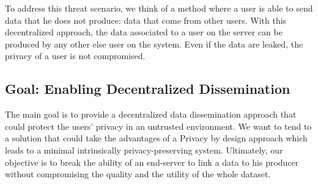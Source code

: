 To address this threat scenario, we think of a method where a user is able to send data that he does not produce: data that come from other users.
With this decentralized approach, the data associated to a user on the server can be produced by any other else user on the system.
Even if the data are leaked, the privacy of a user is not compromised.

\subsection{Goal: Enabling Decentralized Dissemination}

The main goal is to provide a decentralized data dissemination approach that could protect the users' privacy in an untrusted environment.
We want to tend to a solution that could take the advantages of a Privacy by design approach which leads to a minimal intrinsically privacy-preserving system.
Ultimately, our objective is to break the ability of an end-server to link a data to his producer without compromising the quality and the utility of the whole dataset.

